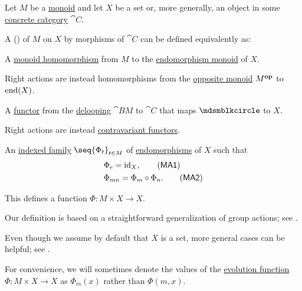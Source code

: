 \begin{definition}\label{def:monoid_action}\mimprovised
  Let \( M \) be a \hyperref[def:monoid]{monoid} and let \( X \) be a set or, more generally, an object in some \hyperref[def:concrete_category]{concrete category} \( \cat{C} \).

  A ()  of \( M \) on \( X \) by morphisms of \( \cat{C} \) can be defined equivalently as:
  \begin{thmenum}
     A \hyperref[def:monoid/homomorphism]{monoid homomorphism} from \( M \) to the \hyperref[def:endomorphism_monoid]{endomorphism monoid} of \( X \).

    Right actions are instead homomorphisms from the \hyperref[def:monoid/opposite]{opposite monoid} \( M^\oppos \) to \( \operatorname{end}(X) \).

     A \hyperref[def:functor]{functor} from the \hyperref[def:monoid_delooping]{delooping} \( \cat{B} M \) to \( \cat{C} \) that maps \( \Anon \) to \( X \).

    Right actions are instead \hyperref[rem:contravariant_functor]{contravariant functors}.

     An \hyperref[def:indexed_family]{indexed family} \( \seq{ \Phi_t }_{t \in M} \) of \hyperref[def:morphism_invertibility/endomorphism]{endomorphisms} of \( X \) such that
    \begin{align}
      &\Phi_e = \id_X,                     \label{eq:def:monoid_action/family/identity}\tag{\logic{MA1}} \\
      &\Phi_{mn} = \Phi_m \bincirc \Phi_n. \label{eq:def:monoid_action/family/compatibility}\tag{\logic{MA2}}
    \end{align}

    This defines a function \( \Phi: M \times X \to X \).
  \end{thmenum}
\end{definition}
  \begin{comments}
  \item Our definition is based on a straightforward generalization of group actions; see .
  \item Even though we assume by default that \( X \) is a set, more general cases can be helpful; see .
  \item For convenience, we will sometimes denote the values of the \hyperref[def:monoid_action]{evolution function} \( \Phi: M \times X \to X \) as \( \Phi_m(x) \) rather than \( \Phi(m, x) \).
\end{comments}
